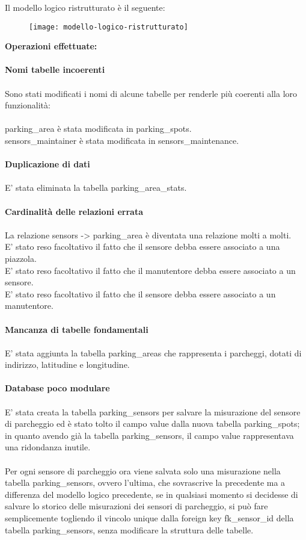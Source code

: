 Il modello logico ristrutturato è il seguente:
\begin{figure}[H]
  \centering
  \texttt{[image: modello-logico-ristrutturato]}
\end{figure}
\leavevmode\newline
\textbf{Operazioni effettuate:}
\\\\
\textbf{Nomi tabelle incoerenti}
\\\\
Sono stati modificati i nomi di alcune tabelle per renderle più coerenti alla loro funzionalità:
\\\\
parking\_area è stata modificata in parking\_spots.
\\
sensors\_maintainer è stata modificata in sensors\_maintenance.
\\\\
\textbf{Duplicazione di dati}
\\\\
E' stata eliminata la tabella parking\_area\_stats.
\\\\
\textbf{Cardinalità delle relazioni errata}
\\\\
La relazione sensors -> parking\_area è diventata una relazione molti a molti.
\\
E' stato reso facoltativo il fatto che il sensore debba essere associato a una piazzola.
\\
E' stato reso facoltativo il fatto che il manutentore debba essere associato a un sensore.
\\
E' stato reso facoltativo il fatto che il sensore debba essere associato a un manutentore.
\\\\
\textbf{Mancanza di tabelle fondamentali}
\\\\
E' stata aggiunta la tabella parking\_areas che rappresenta i parcheggi, dotati di indirizzo, latitudine e 
longitudine.
\\\\
\textbf{Database poco modulare}
\\\\
E' stata creata la tabella parking\_sensors per salvare la misurazione del sensore di parcheggio ed è
stato tolto il campo value dalla nuova tabella parking\_spots; in quanto avendo già la tabella parking\_sensors,
il campo value rappresentava una ridondanza inutile.
\\\\
Per ogni sensore di parcheggio ora viene salvata solo una misurazione nella tabella parking\_sensors, ovvero
l'ultima, che sovrascrive la precedente ma a differenza del modello logico precedente, se in qualsiasi momento
si decidesse di salvare lo storico delle misurazioni dei sensori di parcheggio, si può fare semplicemente togliendo
il vincolo unique dalla foreign key fk\_sensor\_id della tabella parking\_sensors, senza modificare la struttura delle tabelle.